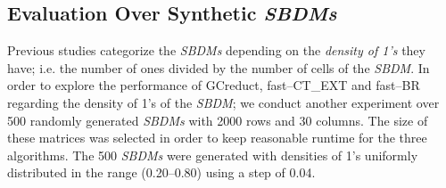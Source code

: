 \documentclass[number,preprint,review,12pt]{elsarticle}
\begin{document}
	
		
		
\subsection{Evaluation Over Synthetic \textit{SBDMs}}\label{sub:synth}

	Previous studies \citep{Rojas12,Lias13,Rodriguez15} categorize the \textit{SBDMs} depending on the \emph{density of 1's} they have; i.e. the number of ones divided by the number of cells of the \textit{SBDM}. In order to explore the performance of GCreduct, fast--CT\_EXT and fast--BR regarding the density of 1's of the \textit{SBDM}; we conduct another experiment over 500 randomly generated \textit{SBDMs} with 2000 rows and 30 columns. The size of these matrices was selected in order to keep reasonable runtime for the three algorithms. The 500 \textit{SBDMs} were generated with densities of 1's uniformly distributed in the range (0.20--0.80) using a step of 0.04. 
				
\end{document}
